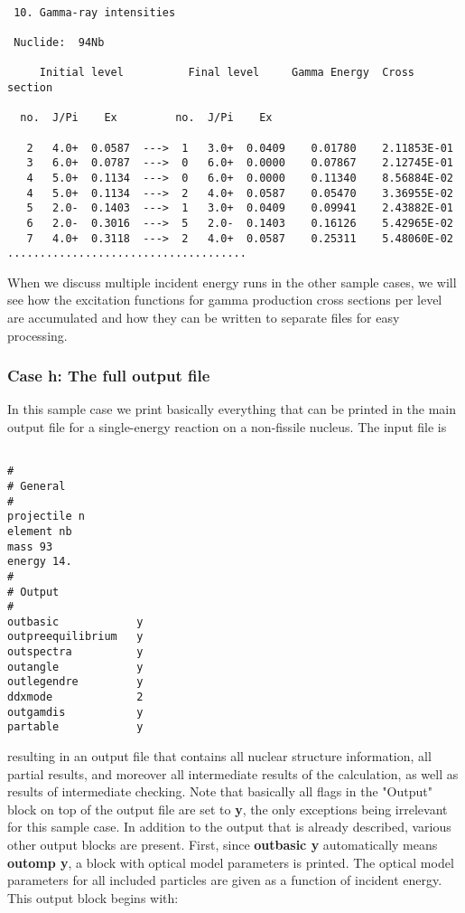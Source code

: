 \begin{samplecase}
{\small \begin{verbatim}

 10. Gamma-ray intensities

 Nuclide:  94Nb

     Initial level          Final level     Gamma Energy  Cross section

  no.  J/Pi    Ex         no.  J/Pi    Ex

   2   4.0+  0.0587  --->  1   3.0+  0.0409    0.01780    2.11853E-01
   3   6.0+  0.0787  --->  0   6.0+  0.0000    0.07867    2.12745E-01
   4   5.0+  0.1134  --->  0   6.0+  0.0000    0.11340    8.56884E-02
   4   5.0+  0.1134  --->  2   4.0+  0.0587    0.05470    3.36955E-02
   5   2.0-  0.1403  --->  1   3.0+  0.0409    0.09941    2.43882E-01
   6   2.0-  0.3016  --->  5   2.0-  0.1403    0.16126    5.42965E-02
   7   4.0+  0.3118  --->  2   4.0+  0.0587    0.25311    5.48060E-02
.....................................
\end{verbatim} } \renewcommand{\baselinestretch}{1.07}\small\normalsize
\noindent
When we discuss multiple incident energy runs in the other sample cases, 
we will see 
how the excitation functions for gamma production cross sections per level are
accumulated and how they can be written to separate files for easy processing.
\subsubsection{Case h: The full output file}    
In this sample case we print basically everything that can be printed in the
main output file for a single-energy reaction on a non-fissile nucleus. 
The input file is

{\small \begin{verbatim}

#
# General
#
projectile n
element nb
mass 93
energy 14.
#
# Output
#
outbasic            y
outpreequilibrium   y
outspectra          y
outangle            y     
outlegendre         y     
ddxmode             2
outgamdis           y
partable            y    
\end{verbatim} } \renewcommand{\baselinestretch}{1.07}\small\normalsize
\noindent
resulting in an output file that contains all nuclear structure information, 
all partial results, and moreover all intermediate results of the 
calculation, as well as results of intermediate checking. Note that basically
all flags in the "Output" block on top of the output file are set to {\bf y},
the only exceptions being irrelevant for this sample case.
In addition to the 
output that is already described, various other output blocks are present.
First, since {\bf outbasic y} automatically means {\bf outomp y}, a block with 
optical model parameters is printed.
The optical model parameters for all
included particles are given as a function of incident energy.
This output block begins with:


\end{samplecase}
